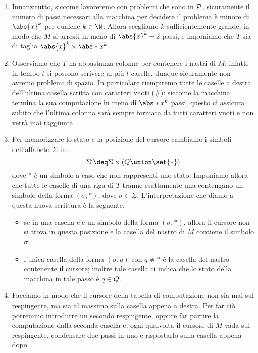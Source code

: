 \begin{enumerate}
  \item Innanzitutto, siccome lavoreremo con problemi che sono in $\P$, sicuramente
    il numero di passi necessari alla macchina per decidere il problema è minore di
    $\abs{x}^k$ per qualche $k \in \N$. Allora scegliamo $k$ sufficientemente grande,
    in modo che $M$ si arresti in meno di $\abs{x}^k - 2$ passi, e imponiamo che
    $T$ sia di taglia $\abs{x}^k \times \abs*{x}^k$.
  \item Osserviamo che $T$ ha abbastanza colonne per contenere i nastri di $M$: 
    infatti in tempo $t$ si possono scrivere al più $t$ caselle, dunque 
    sicuramente non avremo problemi di spazio. In particolare riempiremo tutte 
    le caselle a destra dell'ultima casella scritta con caratteri vuoti ($\#$):
    siccome la macchina termina la sua computazione in meno di $\abs*{x}^k$ passi, 
    questo ci assicura subito che l'ultima colonna sarà sempre formata da tutti
    caratteri vuoti e non verrà mai raggiunta.
  \item Per memorizzare lo stato e la posizione del cursore cambiamo i simboli
    dell'alfabeto $\Sigma$ in \[
        \Sigma' \deq \Sigma \times (Q \union \set{\ast})
    \] dove $\ast$ è un simbolo a caso che non rappresenti uno stato. 
    Imponiamo allora che tutte le caselle di una riga di $T$ tranne esattamente
    una contengano un simbolo della forma $(\sigma, \ast)$, dove $\sigma \in \Sigma$.
    L'interpretazione che diamo a questa nuova scrittura è la seguente:
    \begin{itemize}
      \item se in una casella c'è un simbolo della forma $(\sigma, \ast)$,
        allora il cursore non si trova in questa posizione e la casella del nastro
        di $M$ contiene il simbolo $\sigma$;
      \item l'unica casella della forma $(\sigma, q)$ con $q \neq \ast$ è la casella
        del nastro contenente il cursore; inoltre tale casella ci indica che
        lo stato della macchina in tale passo è $q \in Q$.   
    \end{itemize}
  \item Facciamo in modo che il cursore della tabella di computazione non sia mai
    sul respingente, ma sia al massimo sulla casella appena a destra. Per far ciò
    potremmo introdurre un secondo respingente, oppure far partire la computazione
    dalla seconda casella e, ogni qualvolta il cursore di $M$ vada sul respingente,
    condensare due passi in uno e rispostarlo sulla casella appena dopo.

\end{enumerate}
